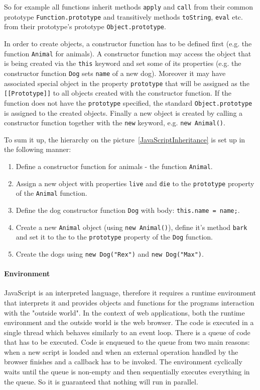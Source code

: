 \documentclass[12pt,a4paper]{report}
\begin{document}
So for example all functions inherit methods \texttt{apply} and \texttt{call} from their common prototype \texttt{Function.prototype} and transitively methods \texttt{toString}, \texttt{eval} etc. from their prototype's prototype \texttt{Object.prototype}.

In order to create objects, a constructor function has to be defined first (e.g. the function \texttt{Animal} for animals). A constructor function may access the object that is being created via the \texttt{this} keyword and set some of its properties (e.g. the constructor function \texttt{Dog} sets \texttt{name} of a new dog). Moreover it may have associated special object in the property \texttt{prototype} that will be assigned as the \texttt{[[Prototype]]} to all objects created with the constructor function. If the function does not have the \texttt{prototype} specified, the standard \texttt{Object.prototype} is assigned to the created objects. Finally a new object is created by calling a constructor function together with the \texttt{new} keyword, e.g. \texttt{new Animal()}.

To sum it up, the hierarchy on the picture~\ref{JavaScriptInheritance} is set up in the following manner:

\begin{enumerate}
\item Define a constructor function for animals - the function \texttt{Animal}.
\item Assign a new object with properties \texttt{live} and \texttt{die} to the \texttt{prototype} property of the \texttt{Animal} function.
\item Define the dog constructor function \texttt{Dog} with body: \texttt{this.name = name;}.
\item Create a new \texttt{Animal} object (using \texttt{new Animal()}), define it's method \texttt{bark} and set it to the to the \texttt{prototype} property of the \texttt{Dog} function.
\item Create the dogs using \texttt{new Dog("Rex")} and \texttt{new Dog("Max")}.
\end{enumerate}

\paragraph{Environment} JavaScript is an interpreted language, therefore it requires a runtime environment that interprets it and provides objects and functions for the programs interaction with the "outside world". In the context of web applications, both the runtime environment and the outside world is the web browser. The code is executed in a single thread which behaves similarly to an event loop. There is a queue of code that has to be executed. Code is enqueued to the queue from two main reasons: when a new script is loaded and when an external operation handled by the browser finishes and a callback has to be invoked. The environment cyclically waits until the queue is non-empty and then sequentially executes everything in the queue. So it is guaranteed that nothing will run in parallel.
\end{document}
